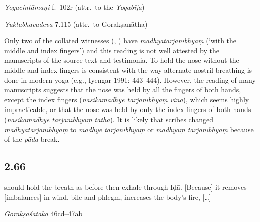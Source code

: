 \begin{ekdosis}
\begin{testimonia}[hp02_065]
\emph{Yogacintāmaṇi} f.~102r (attr.~to the \emph{Yogabīja})

\begin{versinnote}
\end{versinnote}

\emph{Yuktabhavadeva} 7.115 (attr.~to Gorakṣanātha)
\begin{versinnote}
\end{versinnote}
\end{testimonia}

\begin{philcomm}[hp02_065]
Only two of the collated witnesses (, ) have \emph{madhyātarjanībhyāṃ} (`with the middle and index fingers') and this reading is not well attested by the manuscripts of the source text and testimonia. To hold the nose without the middle and index fingers is consistent with the way alternate nostril breathing is done in modern yoga (e.g., Iyengar 1991: 443–444). However, the reading of many manuscripts suggests  that the nose was held by all the fingers of both hands, except the index fingers (\emph{nāsikāmadhye tarjanībhyāṃ vinā}), which seems highly impracticable, or that the nose was held by only the index fingers of both hands (\emph{nāsikāmadhye tarjanībhyāṃ tathā}). It is likely that scribes changed \emph{madhyātarjanībhyāṃ} to \emph{madhye tarjanībhyāṃ} or \emph{madhyaṃ tarjanībhyāṃ} because of the \emph{pāda} break. 
\end{philcomm}

\subsection*{2.66}
\begin{translation} should hold the breath as before then exhale through Iḍā. [Because] it removes [imbalances] in wind, bile and phlegm, increases the body’s fire, [\dots]

\end{translation}

\begin{sources}[hp02_066]
\emph{Gorakṣaśataka} 46cd–47ab


\end{sources}
\end{ekdosis}
